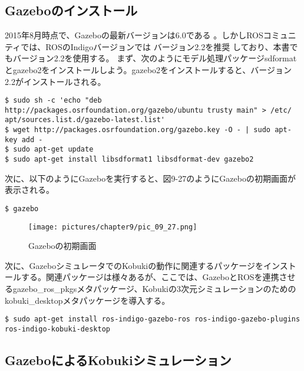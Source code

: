 \begin{itemize}
\subsection{Gazeboのインストール}

2015年8月時点で、Gazeboの最新バージョンは6.0である  。しかしROSコミュニティでは、ROSのIndigoバージョンでは  バージョン2.2を推奨  しており、本書でもバージョン2.2を使用する。
まず、次のようにモデル処理パッケージsdformatとgazebo2をインストールしよう。gazebo2をインストールすると、バージョン2.2がインストールされる。

\begin{lstlisting}[language=ROS]
$ sudo sh -c 'echo "deb http://packages.osrfoundation.org/gazebo/ubuntu trusty main" > /etc/ apt/sources.list.d/gazebo-latest.list'
$ wget http://packages.osrfoundation.org/gazebo.key -O - | sudo apt-key add -
$ sudo apt-get update
$ sudo apt-get install libsdformat1 libsdformat-dev gazebo2
\end{lstlisting}

次に、以下のようにGazeboを実行すると、図9-27のようにGazeboの初期画面が表示される。

\begin{lstlisting}[language=ROS]
$ gazebo
\end{lstlisting}

\begin{figure}[htp]
  \centering
  \texttt{[image: pictures/chapter9/pic\_09\_27.png]}
  \caption{Gazeboの初期画面}
\end{figure}

次に、GazeboシミュレータでのKobukiの動作に関連するパッケージをインストールする。関連パッケージは様々あるが、ここでは、GazeboとROSを連携させるgazebo\_ros\_pkgsメタパッケージ、Kobukiの3次元シミュレーションのためのkobuki\_desktopメタパッケージを導入する。

\begin{lstlisting}[language=ROS]
$ sudo apt-get install ros-indigo-gazebo-ros ros-indigo-gazebo-plugins ros-indigo-kobuki-desktop
\end{lstlisting}

\subsection{GazeboによるKobukiシミュレーション}


\end{itemize}
